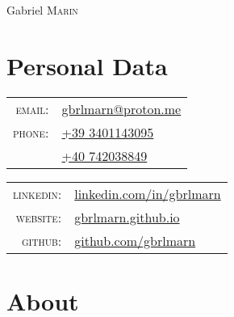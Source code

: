 \documentclass[a4paper,12pt]{article}
\begin{document}
\pagestyle{empty}

\par
  {\centering
    {\Huge Gabriel \textsc{Marin}}
    \bigskip\par
  }

\section{Personal Data}
\begin{multicols}{2}
  \begin{tabular}{rl}
    \textsc{email:}&\href{mailto:gbrlmarn@proton.me}{gbrlmarn@proton.me}\\
    \textsc{phone:}&\href{tel:393401143095}{+39 3401143095}\\
    &\href{tel:40742038849}{+40 742038849}\\
  \end{tabular}
  \columnbreak
  \begin{tabular}{rl}
    \textsc{linkedin:}&\href{https://linkedin.com/in/gbrlmarn}{linkedin.com/in/gbrlmarn}\\
    \textsc{website:}&\href{https://gbrlmarn.github.io}{gbrlmarn.github.io}\\
    \textsc{github:}&\href{https://github.com/gbrlmarn}{github.com/gbrlmarn}\\
  \end{tabular}
\end{multicols}

\section{About}
\end{document}
